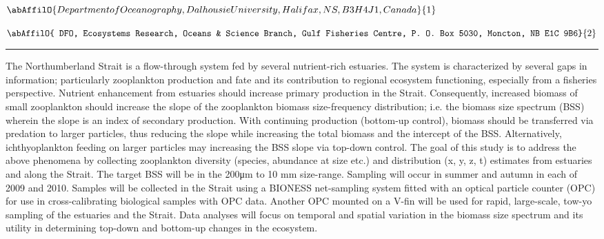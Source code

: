 \begin{center}
   \vspace{2 mm} \begin{center}
    \vspace{2 mm}\begin{center}
  
  $\abAffilO{Department of Oceanography, Dalhousie University, Halifax, NS, B3H 4J1, Canada}{1}$

  
  $\abAffilO{ DFO, Ecosystems Research, Oceans & Science Branch, Gulf Fisheries Centre, P. O. Box 5030, Moncton, NB E1C 9B6}{2}$

  \end{center}
  \vspace{2 mm}
  \end{center}\end{center}
  \begin{center}\rule{0.70\linewidth}{0.5 pt}\end{center}

\noindent The Northumberland Strait is a flow-through system fed by several nutrient-rich estuaries. The system is characterized by several gaps in information; particularly zooplankton production and fate and its contribution to regional ecosystem functioning, especially from a fisheries perspective. Nutrient enhancement from estuaries should increase primary production in the Strait. Consequently, increased biomass of small zooplankton should increase the slope of the zooplankton biomass size-frequency distribution; i.e. the biomass size spectrum (BSS) wherein the slope is an index of secondary production. With continuing production (bottom-up control), biomass should be transferred via predation to larger particles, thus reducing the slope while increasing the total biomass and the intercept of the BSS. Alternatively, ichthyoplankton feeding on larger particles may increasing the BSS slope via top-down control. The goal of this study is to address the above phenomena by collecting zooplankton diversity (species, abundance at size etc.) and distribution (x, y, z, t) estimates from estuaries and along the Strait. The target BSS will be in the 200μm to 10 mm size-range. Sampling will occur in summer and autumn in each of 2009 and 2010. Samples will be collected in the Strait using a BIONESS net-sampling system fitted with an optical particle counter (OPC) for use in cross-calibrating biological samples with OPC data. Another OPC mounted on a V-fin will be used for rapid, large-scale, tow-yo sampling of the estuaries and the Strait. Data analyses will focus on temporal and spatial variation in the biomass size spectrum and its utility in determining top-down and bottom-up changes in the ecosystem.

